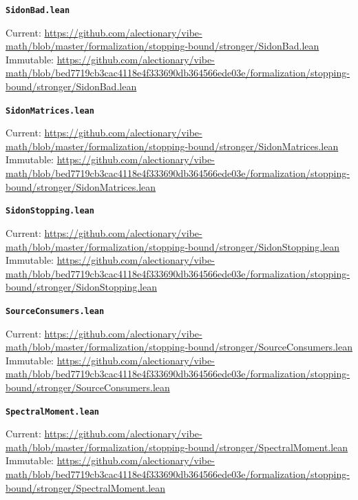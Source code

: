 \smallskip
\medskip
\par\noindent\textbf{\texttt{SidonBad.lean}}\par\nopagebreak
{\footnotesize\noindent Current: \url{https://github.com/alectionary/vibe-math/blob/master/formalization/stopping-bound/stronger/SidonBad.lean}\\
Immutable: \url{https://github.com/alectionary/vibe-math/blob/bed7719cb3cac4118e4f333690db364566ede03e/formalization/stopping-bound/stronger/SidonBad.lean}\par}
\smallskip
\medskip
\par\noindent\textbf{\texttt{SidonMatrices.lean}}\par\nopagebreak
{\footnotesize\noindent Current: \url{https://github.com/alectionary/vibe-math/blob/master/formalization/stopping-bound/stronger/SidonMatrices.lean}\\
Immutable: \url{https://github.com/alectionary/vibe-math/blob/bed7719cb3cac4118e4f333690db364566ede03e/formalization/stopping-bound/stronger/SidonMatrices.lean}\par}
\smallskip
\medskip
\par\noindent\textbf{\texttt{SidonStopping.lean}}\par\nopagebreak
{\footnotesize\noindent Current: \url{https://github.com/alectionary/vibe-math/blob/master/formalization/stopping-bound/stronger/SidonStopping.lean}\\
Immutable: \url{https://github.com/alectionary/vibe-math/blob/bed7719cb3cac4118e4f333690db364566ede03e/formalization/stopping-bound/stronger/SidonStopping.lean}\par}
\smallskip
\medskip
\par\noindent\textbf{\texttt{SourceConsumers.lean}}\par\nopagebreak
{\footnotesize\noindent Current: \url{https://github.com/alectionary/vibe-math/blob/master/formalization/stopping-bound/stronger/SourceConsumers.lean}\\
Immutable: \url{https://github.com/alectionary/vibe-math/blob/bed7719cb3cac4118e4f333690db364566ede03e/formalization/stopping-bound/stronger/SourceConsumers.lean}\par}
\smallskip
\medskip
\par\noindent\textbf{\texttt{SpectralMoment.lean}}\par\nopagebreak
{\footnotesize\noindent Current: \url{https://github.com/alectionary/vibe-math/blob/master/formalization/stopping-bound/stronger/SpectralMoment.lean}\\
Immutable: \url{https://github.com/alectionary/vibe-math/blob/bed7719cb3cac4118e4f333690db364566ede03e/formalization/stopping-bound/stronger/SpectralMoment.lean}\par}
